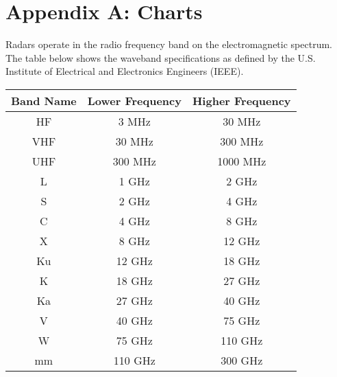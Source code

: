 \documentclass[12pt]{article}
\begin{document}
\section{Appendix A: Charts}
Radars operate in the radio frequency band on the electromagnetic spectrum. The table below shows the waveband specifications as defined by the U.S. Institute of Electrical and Electronics Engineers (IEEE).
\begin{center}
    \begin{tabular}{ |c|c|c| }
        \hline
            Band Name & Lower Frequency & Higher Frequency \\
        \hline
        \hline
            HF & 3 MHz & 30 MHz \\
            VHF & 30 MHz & 300 MHz \\
            UHF & 300 MHz & 1000 MHz \\
            L & 1 GHz & 2 GHz \\
            S & 2 GHz & 4 GHz \\
            C & 4 GHz & 8 GHz \\
            X & 8 GHz & 12 GHz \\
            Ku & 12 GHz & 18 GHz \\
            K & 18 GHz & 27 GHz \\
            Ka & 27 GHz & 40 GHz \\
            V & 40 GHz & 75 GHz \\
            W & 75 GHz & 110 GHz \\
            mm & 110 GHz & 300 GHz \\
        \hline
    \end{tabular}
\end{center}
\end{document}
